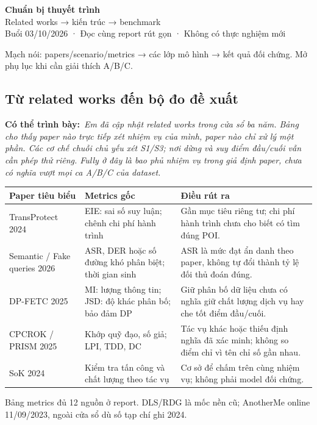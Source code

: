 \documentclass[10pt,a4paper]{article}
\newcommand{\key}[1]{\par\smallskip\noindent\colorbox{pale}{\parbox{\dimexpr\linewidth-2\fboxsep}{#1}}\par\smallskip}
\newcommand{\say}[1]{\par\textbf{Có thể trình bày:}\ \textit{#1}\par}
\begin{document}
\begin{center}
{\LARGE\bfseries\color{ink}Chuẩn bị thuyết trình}\\[5pt]
{\large Related works → kiến trúc → benchmark}\\[3pt]
{\small Buổi 03/10/2026 · Đọc cùng report rút gọn · Không có thực nghiệm mới}
\end{center}
\key{Mạch nói: papers/scenario/metrics → các lớp mô hình → kết quả đối chứng. Mở phụ lục khi cần giải thích A/B/C.}


\clearpage\subsection{Từ related works đến bộ đo đề xuất}
\say{Em đã cập nhật related works trong cửa sổ ba năm. Bảng cho thấy paper nào trực tiếp xét nhiệm vụ của mình, paper nào chỉ xử lý một phần. Các cơ chế chuỗi chủ yếu xét S1/S3; nơi dừng và suy điểm đầu/cuối vẫn cần phép thử riêng. Fully ở đây là bao phủ nhiệm vụ trong giả định paper, chưa có nghĩa vượt mọi ca A/B/C của dataset.}

\begin{longtable}{@{}P{4.1cm}P{5.4cm}P{6.1cm}@{}}
\toprule Paper tiêu biểu & Metrics gốc & Điều rút ra\\\midrule
TransProtect 2024 & EIE: sai số suy luận; chênh chi phí hành trình & Gần mục tiêu riêng tư; chi phí hành trình chưa cho biết có tìm đúng POI.\\
Semantic / Fake queries 2026 & ASR, DER hoặc số đường khó phân biệt; thời gian sinh & ASR là mức đạt ẩn danh theo paper, không tự đổi thành tỷ lệ đối thủ đoán đúng.\\
DP-FETC 2025 & MI: lượng thông tin; JSD: độ khác phân bố; bảo đảm DP & Giữ phân bố dữ liệu chưa có nghĩa giữ chất lượng dịch vụ hay che tốt điểm đầu/cuối.\\
CPCROK / PRISM 2025 & Khớp quỹ đạo, số giả; LPI, TDD, DC & Tác vụ khác hoặc thiếu định nghĩa đã xác minh; không so điểm chỉ vì tên chỉ số gần nhau.\\
SoK 2024 & Kiểm tra tấn công và chất lượng theo tác vụ & Cơ sở để chấm trên cùng nhiệm vụ; không phải model đối chứng.\\
\bottomrule
\end{longtable}
Bảng metrics đủ 12 nguồn ở report. DLS/RDG là mốc nền cũ; AnotherMe online 11/09/2023, ngoài cửa sổ dù số tạp chí ghi 2024.
\end{document}
